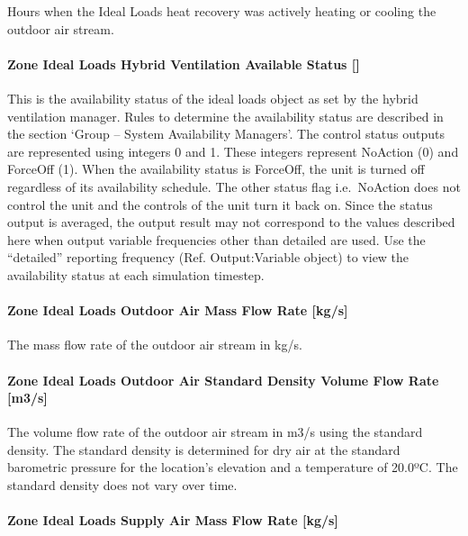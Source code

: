 Hours when the Ideal Loads heat recovery was actively heating or cooling the outdoor air stream.

\paragraph{Zone Ideal Loads Hybrid Ventilation Available Status {[]}}\label{zone-ideal-loads-hybrid-ventilation-available-status}

This is the availability status of the ideal loads object as set by the hybrid ventilation manager. Rules to determine the availability status are described in the section `Group -- System Availability Managers'. The control status outputs are represented using integers 0 and 1. These integers represent NoAction (0) and ForceOff (1). When the availability status is ForceOff, the unit is turned off regardless of its availability schedule. The other status flag i.e.~NoAction does not control the unit and the controls of the unit turn it back on. Since the status output is averaged, the output result may not correspond to the values described here when output variable frequencies other than detailed are used. Use the ``detailed'' reporting frequency (Ref. Output:Variable object) to view the availability status at each simulation timestep.

\paragraph{Zone Ideal Loads Outdoor Air Mass Flow Rate {[}kg/s{]}}\label{zone-ideal-loads-outdoor-air-mass-flow-rate-kgs}

The mass flow rate of the outdoor air stream in kg/s.

\paragraph{Zone Ideal Loads Outdoor Air Standard Density Volume Flow Rate {[}m3/s{]}}\label{zone-ideal-loads-outdoor-air-standard-density-volume-flow-rate-m3s}

The volume flow rate of the outdoor air stream in m3/s using the standard density. The standard density is determined for dry air at the standard barometric pressure for the location's elevation and a temperature of 20.0º\si{C}. The standard density does not vary over time.

\paragraph{Zone Ideal Loads Supply Air Mass Flow Rate {[}kg/s{]}}\label{zone-ideal-loads-supply-air-mass-flow-rate-kgs}

